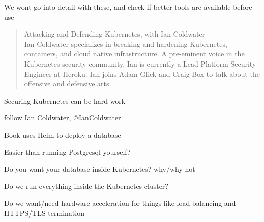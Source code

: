 \documentclass[Screen16to9,17pt]{foils}
\begin{document}
We wont go into detail with these, and check if better tools are available before use



\begin{quote}
  Attacking and Defending Kubernetes, with Ian Coldwater\\
  Ian Coldwater specializes in breaking and hardening Kubernetes, containers, and cloud native infrastructure. A pre-eminent voice in the Kubernetes security community, Ian is currently a Lead Platform Security Engineer at Heroku. Ian joins Adam Glick and Craig Box to talk about the offensive and defensive arts.
\end{quote}
{\footnotesize{}}

\begin{list2}
  \item Securing Kubernetes can be hard work
  \item
  \item follow Ian Coldwater, @IanColdwater 
\end{list2}





\begin{quote}

\end{quote}

\begin{list2}
  \item Book uses Helm to deploy a database
  \item Easier than running Postgresql yourself?
  \item Do you want your database inside Kubernetes? why/why not
\end{list2}



\begin{quote}

\end{quote}

\begin{list2}
  \item Do we run everything inside the Kubernetes cluster?
  \item Do we want/need hardware acceleration for things like load balancing and HTTPS/TLS termination
\end{list2}
\end{document}

